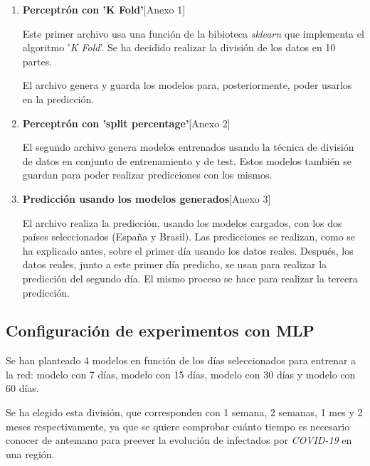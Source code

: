 \documentclass[12pt,a4paper, xcolor=table]{article}
\begin{document}
    \begin{enumerate}
      \item \textbf{Perceptrón con 'K Fold'}[Anexo 1]

        Este primer archivo usa una función de la bibioteca \textit{sklearn} que implementa el algoritmo '\textit{K Fold}'. Se ha decidido realizar la división de los datos en 10 partes.

        \vspace{2mm}

        El archivo genera y guarda los modelos para, posteriormente, poder usarlos en la predicción.

      \item \textbf{Perceptrón con 'split percentage'}[Anexo 2]

        El segundo archivo genera modelos entrenados usando la técnica de división de datos en conjunto de entrenamiento y de test. Estos modelos también se guardan para poder realizar predicciones con los mismos.

      \item \textbf{Predicción usando los modelos generados}[Anexo 3]

        El archivo realiza la predicción, usando los modelos cargados, con los dos países seleccionados (España y Brasil). Las predicciones se realizan, como se ha explicado antes, sobre el primer día usando los datos reales. Después, los datos reales, junto a este primer día predicho, se usan para realizar la predicción del segundo día. El mismo proceso se hace para realizar la tercera predicción.

    \end{enumerate}




    \subsection{Configuración de experimentos con MLP}

      Se han planteado 4 modelos en función de los días seleccionados para entrenar a la red: modelo con 7 días, modelo con 15 días, modelo con 30 días y modelo con 60 días.

      \vspace{2mm}

      Se ha elegido esta división, que corresponden con 1 semana, 2 semanas, 1 mes y 2 meses respectivamente, ya que se quiere comprobar cuánto tiempo es necesario conocer de antemano para preever la evolución de infectados por \textit{COVID-19} en una región.
\end{document}
